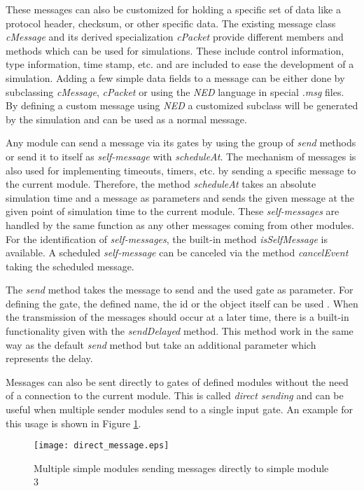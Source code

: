 These messages can also be customized for holding a specific set of data like a protocol header, checksum, or other specific data.
The existing message class \emph{cMessage} and its derived specialization \emph{cPacket} provide different members and methods which can be used for simulations.
These include control information, type information, time stamp, etc. and are included to ease the development of a simulation.
Adding a few simple data fields to a message can be either done by subclassing \emph{cMessage}, \emph{cPacket} or using the \emph{NED} language in special \emph{.msg} files.
By defining a custom message using \emph{NED} a customized subclass will be generated by the simulation and can be used as a normal message. \cite[chapter 6]{omnet_manual}

Any module can send a message via its gates by using the group of \emph{send} methods or send it to itself as \emph{self-message} with \emph{scheduleAt}.
The mechanism of messages is also used for implementing timeouts, timers, etc. by sending a specific message to the current module.
Therefore, the method \emph{scheduleAt} takes an absolute simulation time and a message as parameters and sends the given message at the given point of simulation time to the current module.
These \emph{self-messages} are handled by the same function as any other messages coming from other modules.
For the identification of \emph{self-messages}, the built-in method \emph{isSelfMessage} is available.
A scheduled \emph{self-message} can be canceled via the method \emph{cancelEvent} taking the scheduled message. \cite[section 4.7.1]{omnet_manual}

The \emph{send} method takes the message to send and the used gate as parameter.
For defining the gate, the defined name, the id or the object itself can be used \cite[section 4.7.2]{omnet_manual}.
When the transmission of the messages should occur at a later time, there is a built-in functionality given with the \mbox{\emph{sendDelayed}} method.
This method work in the same way as the default \emph{send} method but take an additional parameter which represents the delay. \cite[section 4.7.6]{omnet_manual}

Messages can also be sent directly to gates of defined modules without the need of a connection to the current module.
This is called \emph{direct sending} and can be useful when multiple sender modules send to a single input gate.
An example for this usage is shown in Figure \ref{fig:direct_sending}.

\begin{figure}
        \centering
        \texttt{[image: direct\_message.eps]}
        \caption{Multiple simple modules sending messages directly to simple module 3}
        \label{fig:direct_sending}
\end{figure}

